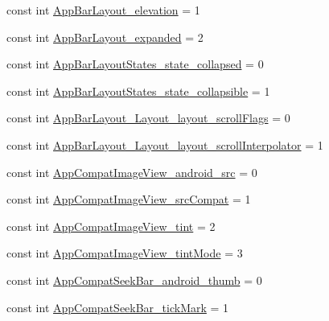 \begin{DoxyCompactItemize}
const int \mbox{\hyperlink{class_f_w_p_s___app_1_1_droid_1_1_resource_1_1_styleable_a6e277c2a4d1f922d683772880764c23b}{App\+Bar\+Layout\+\_\+elevation}} = 1
\item 
const int \mbox{\hyperlink{class_f_w_p_s___app_1_1_droid_1_1_resource_1_1_styleable_a4eeac7636b81f618d1f3a47f530a5c37}{App\+Bar\+Layout\+\_\+expanded}} = 2
\item 
const int \mbox{\hyperlink{class_f_w_p_s___app_1_1_droid_1_1_resource_1_1_styleable_a0266538dc13dc4c01d228d1ef4176040}{App\+Bar\+Layout\+States\+\_\+state\+\_\+collapsed}} = 0
\item 
const int \mbox{\hyperlink{class_f_w_p_s___app_1_1_droid_1_1_resource_1_1_styleable_adcb91d4145f8d1077e23626a6e649cc4}{App\+Bar\+Layout\+States\+\_\+state\+\_\+collapsible}} = 1
\item 
const int \mbox{\hyperlink{class_f_w_p_s___app_1_1_droid_1_1_resource_1_1_styleable_abf295cfed7e0fa195b397340993b65ed}{App\+Bar\+Layout\+\_\+\+Layout\+\_\+layout\+\_\+scroll\+Flags}} = 0
\item 
const int \mbox{\hyperlink{class_f_w_p_s___app_1_1_droid_1_1_resource_1_1_styleable_a7269194c0b1169ae194e3a39dc49ed75}{App\+Bar\+Layout\+\_\+\+Layout\+\_\+layout\+\_\+scroll\+Interpolator}} = 1
\item 
const int \mbox{\hyperlink{class_f_w_p_s___app_1_1_droid_1_1_resource_1_1_styleable_a7908ffb8b52827ec1aa4f95f4ef59363}{App\+Compat\+Image\+View\+\_\+android\+\_\+src}} = 0
\item 
const int \mbox{\hyperlink{class_f_w_p_s___app_1_1_droid_1_1_resource_1_1_styleable_aba43b3aef89dd058dcff160a07a980d5}{App\+Compat\+Image\+View\+\_\+src\+Compat}} = 1
\item 
const int \mbox{\hyperlink{class_f_w_p_s___app_1_1_droid_1_1_resource_1_1_styleable_acc97d56847a3b67af04973f7e8914b45}{App\+Compat\+Image\+View\+\_\+tint}} = 2
\item 
const int \mbox{\hyperlink{class_f_w_p_s___app_1_1_droid_1_1_resource_1_1_styleable_a1681b533e21eeee6724d7e0812496e56}{App\+Compat\+Image\+View\+\_\+tint\+Mode}} = 3
\item 
const int \mbox{\hyperlink{class_f_w_p_s___app_1_1_droid_1_1_resource_1_1_styleable_a9c5db7122eb8c0dc8509f0b88be81fb5}{App\+Compat\+Seek\+Bar\+\_\+android\+\_\+thumb}} = 0
\item 
const int \mbox{\hyperlink{class_f_w_p_s___app_1_1_droid_1_1_resource_1_1_styleable_a9df132aa427753fce7d464b426085ba4}{App\+Compat\+Seek\+Bar\+\_\+tick\+Mark}} = 1
\item 

\end{DoxyCompactItemize}
